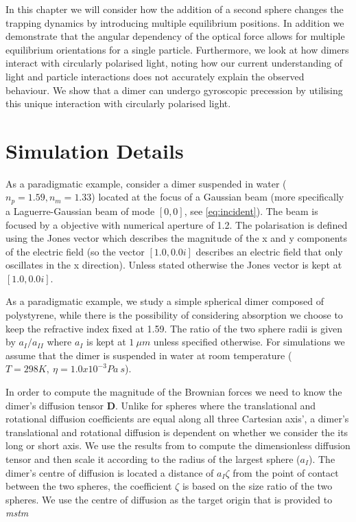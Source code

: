  In this chapter we will consider how the addition of a 
 second sphere changes the trapping dynamics by introducing 
 multiple equilibrium positions. In addition we demonstrate 
 that the angular dependency of the optical force allows for 
 multiple equilibrium orientations for a single particle. 
 Furthermore, we look at how dimers interact with circularly 
 polarised light, noting how our current understanding of 
 light and particle interactions does not accurately explain 
 the observed behaviour. We show that a dimer can undergo 
 gyroscopic precession by utilising this unique interaction 
 with circularly polarised light.  
 
\section{Simulation Details}
As a paradigmatic example, consider a dimer suspended in 
water ($n_p = 1.59, n_m = 1.33$) located at the focus of 
a Gaussian beam (more specifically a Laguerre-Gaussian 
beam of mode $[0,0]$, see \eqref{eq:incident}). The beam 
is focused by a objective with numerical aperture of 1.2.
The polarisation is defined using the Jones vector which 
describes the magnitude of the x and y components of the 
electric field (so the vector $[1.0, 0.0i]$ describes an 
electric field that only oscillates in the x direction). 
Unless stated otherwise the Jones vector is kept at $[1.0, 
0.0i]$. 

As a paradigmatic example, we study a simple spherical 
dimer composed of polystyrene, while there is the 
possibility of considering absorption we choose to keep 
the refractive index fixed at 1.59. The ratio of the two 
sphere radii is given by $a_{I}/a_{II}$ where $a_{I}$ is 
kept at $1\ \mu m$ unless specified otherwise. For 
simulations we assume that the dimer is suspended in water 
at room temperature ($T = 298K,\ \eta = 1.0x10^{-3}Pa\ s$).

In order to compute the magnitude of the Brownian forces we
need to know the dimer's diffusion tensor \textbf{D}. Unlike
for spheres where the translational and rotational diffusion 
coefficients are equal along all three Cartesian axis', a
dimer's translational and rotational diffusion is dependent
on whether we consider the its long or short axis. We use
the results from \cite{Nir1973} to compute the dimensionless 
diffusion tensor and then scale it according to the radius of
the largest sphere ($a_I$). The dimer's centre of diffusion
is located a distance of $a_I\zeta$ from the point of contact
between the two spheres, the coefficient $\zeta$ is based on
the size ratio of the two spheres. We use the centre of 
diffusion as the target origin that is provided to \textit{mstm}

